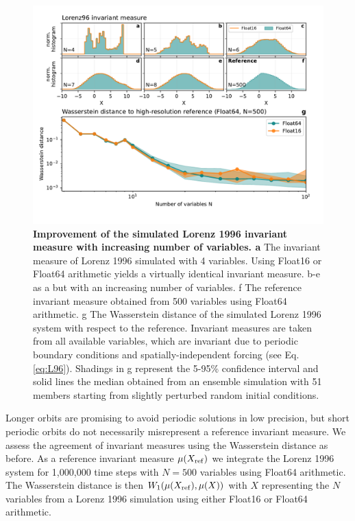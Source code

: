 \begin{figure}[tbhp]
	\includegraphics[width=1\textwidth]{Figures/orbits/L96_invmeasures.pdf}
	\caption{\textbf{Improvement of the simulated Lorenz 1996 invariant measure with increasing
	number of variables. a} The invariant measure of Lorenz 1996 simulated with 4 variables. Using
	Float16 or Float64 arithmetic yields a virtually identical invariant measure. b-e as a but with an
	increasing number of variables. f The reference invariant measure obtained from 500 variables
	using Float64 arithmetic. g The Wasserstein distance of the simulated Lorenz 1996 system with
	respect to the reference. Invariant measures are taken from all available variables, which are
	invariant due to periodic boundary conditions and spatially-independent forcing (see Eq. \ref{eq:L96}).
	Shadings in g represent the 5-95\% confidence interval and solid lines the median obtained from
	an ensemble simulation with 51 members starting from slightly perturbed random initial conditions.}
	\label{fig:L96_invmeasures}
\end{figure}

Longer orbits are promising to avoid periodic solutions in low precision, but short periodic orbits do not necessarily misrepresent a
reference invariant measure. We assess the agreement of invariant measures using the Wasserstein distance as before. As a reference
invariant measure $\mu(X_{\operatorname{ref}})$ we integrate the Lorenz 1996 system for 1,000,000 time steps with $N=500$ variables using
Float64 arithmetic. The Wasserstein distance is then $W_1(\mu(X_{\operatorname{ref}}),\mu(X))$ with $X$ representing the $N$ variables from a
Lorenz 1996 simulation using either Float16 or Float64 arithmetic. 

